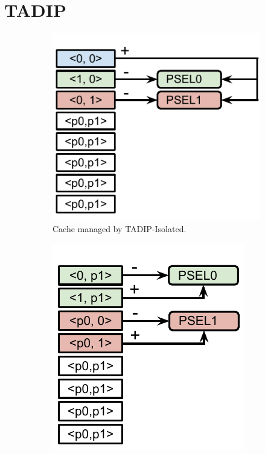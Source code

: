\section{TADIP}
\label{sec:algorithms:tadip}

\begin{figure}[H]
    \centering
    \begin{subfigure}[b]{0.5\textwidth}
        \includegraphics[width=\textwidth]{figures/algorithms/TADIP-I}
        \caption{Cache managed by TADIP-Isolated.}
        \label{fig:algorithms:tadip:isolated}
    \end{subfigure}
    \begin{subfigure}[b]{0.5\textwidth}
        \includegraphics[width=\textwidth]{figures/algorithms/TADIP-F}

\end{subfigure}
\end{figure}
